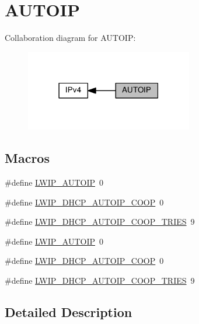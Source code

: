 \hypertarget{group__lwip__opts__autoip}{}\section{A\+U\+T\+O\+IP}
\label{group__lwip__opts__autoip}
Collaboration diagram for A\+U\+T\+O\+IP\+:
\nopagebreak
\begin{figure}[H]
\begin{center}
\leavevmode
\includegraphics[width=207pt]{group__lwip__opts__autoip}
\end{center}
\end{figure}
\subsection*{Macros}
\begin{DoxyCompactItemize}
\item 
\#define \hyperlink{group__lwip__opts__autoip_gaaf1b3a089827223589baf1b7f4f57069}{L\+W\+I\+P\+\_\+\+A\+U\+T\+O\+IP}~0
\item 
\#define \hyperlink{group__lwip__opts__autoip_ga1a91e18dbb9777bc6e3963f52cb5f9fe}{L\+W\+I\+P\+\_\+\+D\+H\+C\+P\+\_\+\+A\+U\+T\+O\+I\+P\+\_\+\+C\+O\+OP}~0
\item 
\#define \hyperlink{group__lwip__opts__autoip_ga4ff3f941b4c71a04b0c30fbee5b198c2}{L\+W\+I\+P\+\_\+\+D\+H\+C\+P\+\_\+\+A\+U\+T\+O\+I\+P\+\_\+\+C\+O\+O\+P\+\_\+\+T\+R\+I\+ES}~9
\item 
\#define \hyperlink{group__lwip__opts__autoip_gaaf1b3a089827223589baf1b7f4f57069}{L\+W\+I\+P\+\_\+\+A\+U\+T\+O\+IP}~0
\item 
\#define \hyperlink{group__lwip__opts__autoip_ga1a91e18dbb9777bc6e3963f52cb5f9fe}{L\+W\+I\+P\+\_\+\+D\+H\+C\+P\+\_\+\+A\+U\+T\+O\+I\+P\+\_\+\+C\+O\+OP}~0
\item 
\#define \hyperlink{group__lwip__opts__autoip_ga4ff3f941b4c71a04b0c30fbee5b198c2}{L\+W\+I\+P\+\_\+\+D\+H\+C\+P\+\_\+\+A\+U\+T\+O\+I\+P\+\_\+\+C\+O\+O\+P\+\_\+\+T\+R\+I\+ES}~9
\end{DoxyCompactItemize}


\subsection{Detailed Description}


